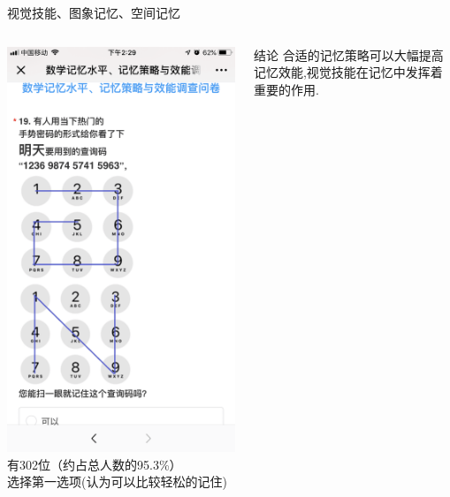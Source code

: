 \documentclass[serif]{beamer}
\begin{document}
\begin{frame}{视觉技能、图象记忆、空间记忆}
\begin{columns}
    	\includegraphics[scale=0.08]{test19.png}\\
    	\scriptsize {有302位（约占总人数的95.3\%）}\\
    	\scriptsize {选择第一选项(认为可以比较轻松的记住)}
    	\begin{block}{结论}
    		合适的记忆策略可以大幅提高记忆效能,视觉技能在记忆中发挥着重要的作用.
    	\end{block}    	
    \end{columns}            
    \end{frame}
    
\end{document}
